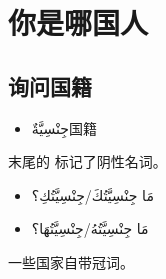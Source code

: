 \chapter{你是哪国人}

\section{ 询问国籍}

\begin{itemize}
    \item \ac{جِنْسِيَّةٌ}{国籍}
\end{itemize}

末尾的  标记了阴性名词。

\begin{Arabic}
    \begin{itemize}
        \item مَا جِنْسِيَّتُكَ/جِنْسِيَّتُكِ؟
        \item مَا جِنْسِيَّتُهُ/جِنْسِيَّتُهَا؟
    \end{itemize}
\end{Arabic}

一些国家自带冠词。

